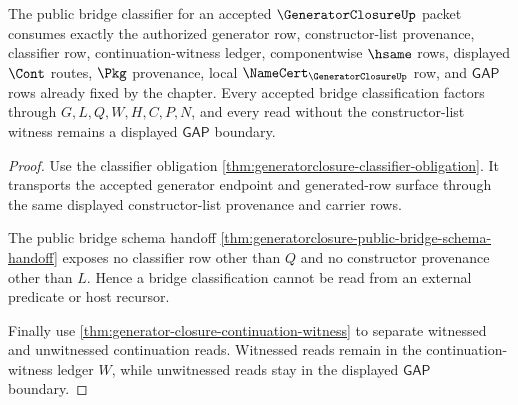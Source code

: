 \begin{theorem}
\label{thm:generatorclosure-bridge-classifier-obligation}
The public bridge classifier for an accepted $\GeneratorClosureUp$ packet consumes exactly the authorized generator row, constructor-list provenance, classifier row, continuation-witness ledger, componentwise $\hsame$ rows, displayed $\Cont$ routes, $\Pkg$ provenance, local $\NameCert_{\GeneratorClosureUp}$ row, and $\mathsf{GAP}$ rows already fixed by the chapter. Every accepted bridge classification factors through $G,L,Q,W,H,C,P,N$, and every read without the constructor-list witness remains a displayed $\mathsf{GAP}$ boundary.
\end{theorem}
\begin{proof}
Use the classifier obligation \autoref{thm:generatorclosure-classifier-obligation}. It transports the accepted generator endpoint and generated-row surface through the same displayed constructor-list provenance and carrier rows.

The public bridge schema handoff \autoref{thm:generatorclosure-public-bridge-schema-handoff} exposes no classifier row other than $Q$ and no constructor provenance other than $L$. Hence a bridge classification cannot be read from an external predicate or host recursor.

Finally use \autoref{thm:generator-closure-continuation-witness} to separate witnessed and unwitnessed continuation reads. Witnessed reads remain in the continuation-witness ledger $W$, while unwitnessed reads stay in the displayed $\mathsf{GAP}$ boundary.
\end{proof}

